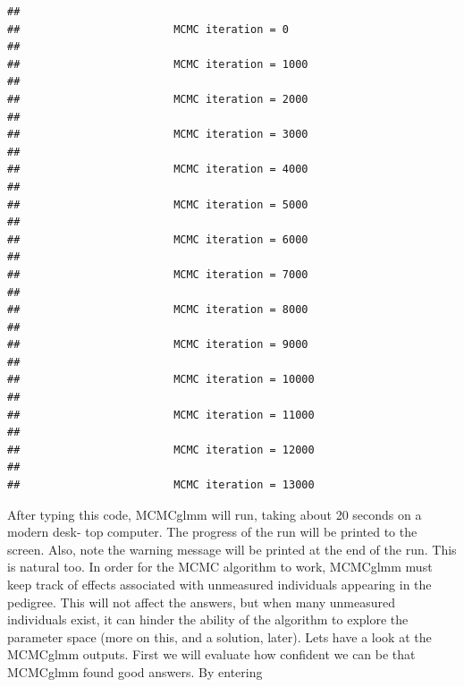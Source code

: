 \documentclass[
  12pt,
]{book}
\newenvironment{Shaded}{\begin{snugshade}}{\end{snugshade}}
\newcommand{\AttributeTok}[1]{\textcolor[rgb]{0.77,0.63,0.00}{#1}}
\newcommand{\DecValTok}[1]{\textcolor[rgb]{0.00,0.00,0.81}{#1}}
\newcommand{\FloatTok}[1]{\textcolor[rgb]{0.00,0.00,0.81}{#1}}
\newcommand{\FunctionTok}[1]{\textcolor[rgb]{0.00,0.00,0.00}{#1}}
\newcommand{\NormalTok}[1]{#1}
\newcommand{\OtherTok}[1]{\textcolor[rgb]{0.56,0.35,0.01}{#1}}
\newcommand{\SpecialCharTok}[1]{\textcolor[rgb]{0.00,0.00,0.00}{#1}}
\begin{document}
\begin{Shaded}
\end{Shaded}

\begin{verbatim}
## 
##                        MCMC iteration = 0
## 
##                        MCMC iteration = 1000
## 
##                        MCMC iteration = 2000
## 
##                        MCMC iteration = 3000
## 
##                        MCMC iteration = 4000
## 
##                        MCMC iteration = 5000
## 
##                        MCMC iteration = 6000
## 
##                        MCMC iteration = 7000
## 
##                        MCMC iteration = 8000
## 
##                        MCMC iteration = 9000
## 
##                        MCMC iteration = 10000
## 
##                        MCMC iteration = 11000
## 
##                        MCMC iteration = 12000
## 
##                        MCMC iteration = 13000
\end{verbatim}

After typing this code, MCMCglmm will run, taking about 20 seconds on a modern desk- top computer. The progress of the run will be printed to the screen. Also, note the warning message will be printed at the end of the run. This is natural too. In order for the MCMC algorithm to work, MCMCglmm must keep track of effects associated with unmeasured individuals appearing in the pedigree. This will not affect the answers, but when many unmeasured individuals exist, it can hinder the ability of the algorithm to explore the parameter space (more on this, and a solution, later). Lets have a look at the MCMCglmm outputs. First we will evaluate how confident we can be that MCMCglmm found good answers. By entering

\begin{Shaded}
\end{Shaded}
\end{document}
